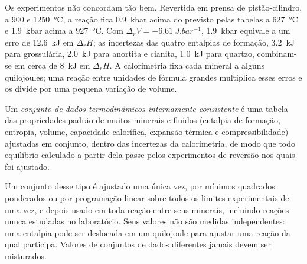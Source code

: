 Os experimentos não concordam tão bem. Revertida em prensa de pistão-cilindro, a
900 e \qty{1250}{\celsius}, a reação fica \qty{0.9}{kbar} acima do previsto pelas
tabelas a \qty{627}{\celsius} e \qty{1.9}{kbar} acima a
\qty{927}{\celsius}. Com $\Delta_rV = \qty{-6.61}{J.bar^{-1}}$,
\qty{1.9}{kbar} equivale a um erro de \qty{12.6}{kJ} em $\Delta_rH$; as
incertezas das quatro entalpias de formação, \qty{3.2}{kJ} para
grossulária, \qty{2.0}{kJ} para anortita e cianita, \qty{1.0}{kJ} para
quartzo, combinam-se em cerca de \qty{8}{kJ} em $\Delta_rH$. A calorimetria fixa cada
mineral a alguns quilojoules; uma reação entre unidades de fórmula grandes multiplica
esses erros e os divide por uma pequena variação de volume.

\begin{definition}\label{def:b3:petrological-thermodynamics:dataset}
Um \emph{conjunto de dados termodinâmicos internamente consistente}
é uma tabela das propriedades padrão de
muitos minerais e fluidos (entalpia de formação, entropia, volume, capacidade
calorífica, expansão térmica e compressibilidade) ajustadas em conjunto, dentro
das incertezas da calorimetria, de modo que todo equilíbrio calculado a partir dela
passe pelos experimentos de reversão nos quais foi ajustado.
\end{definition}

Um conjunto desse tipo é ajustado uma única vez, por mínimos quadrados ponderados ou por
programação linear sobre todos os limites experimentais de uma vez, e depois usado em toda
reação entre seus minerais, incluindo reações nunca estudadas no
laboratório. Seus valores não são medidas independentes: uma entalpia pode
ser deslocada em um quilojoule para ajustar uma reação da qual participa. Valores de
conjuntos de dados diferentes jamais devem ser misturados.


